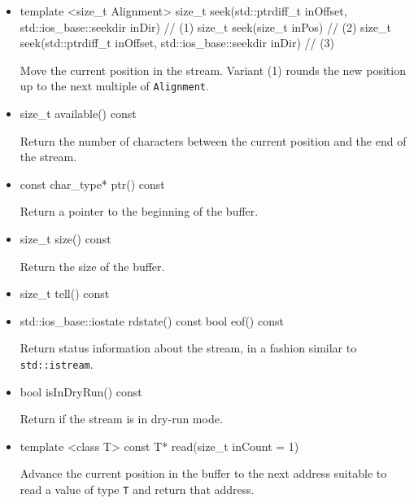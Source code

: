 \begin{itemize}
	\item
		\begin{cppsnippet}
		template <size_t Alignment>
		size_t seek(std::ptrdiff_t inOffset, std::ios_base::seekdir inDir) // (1)
		size_t seek(size_t inPos) // (2)
		size_t seek(std::ptrdiff_t inOffset, std::ios_base::seekdir inDir) // (3)
		\end{cppsnippet}
		
		Move the current position in the stream. Variant (1) rounds the new position up to the next multiple of \texttt{Alignment}.
	
	\item
		\begin{cppsnippet}
		size_t available() const
		\end{cppsnippet}
		
		Return the number of characters between the current position and the end of the stream.
		
	\item
		\begin{cppsnippet}
		const char_type* ptr() const
		\end{cppsnippet}
		
		Return a pointer to the beginning of the buffer.
	
	\item
		\begin{cppsnippet}
		size_t size() const
		\end{cppsnippet}
		
		Return the size of the buffer.
	
	\item
		\begin{cppsnippet}
		size_t tell() const
		\end{cppsnippet}
	
	\item
		\begin{cppsnippet}
		std::ios_base::iostate rdstate() const
		bool eof() const
		\end{cppsnippet}
	
		Return status information about the stream, in a fashion similar to \texttt{std::istream}.
	\item
		\begin{cppsnippet}
		bool isInDryRun() const
		\end{cppsnippet}
	
		Return if the stream is in dry-run mode.

	\item
		\begin{cppsnippet}
		template <class T> const T* read(size_t inCount = 1)
		\end{cppsnippet}
		
		Advance the current position in the buffer to the next address suitable to read a value of type \texttt{T} and return that address.
\end{itemize}

